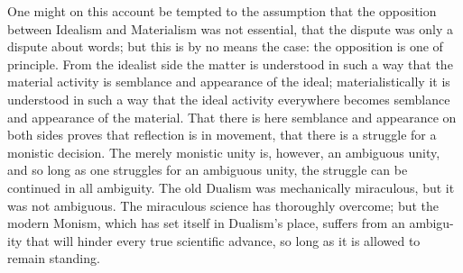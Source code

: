 \documentclass[12pt]{article}
\begin{document}
One might on this account be tempted to the assumption that the opposition
between Idealism and Materialism was not essential, that the dispute was
only a dispute about words; but this is by no means the case: the opposition
is one of principle. From the idealist side the matter is understood in such
a way that the material activity is semblance and appearance of the ideal;
materialistically it is understood in such a way that the ideal activity
everywhere becomes semblance and appearance of the material. That there is
here semblance and appearance on both sides proves that reflection is in
movement, that there is a struggle for a monistic decision. The merely
monistic unity is, however, an ambiguous unity, and so long as one struggles
for an ambiguous unity, the struggle can be continued in all ambiguity. The
old Dualism was mechanically miraculous, but it was not ambiguous. The
miraculous science has thoroughly overcome; but the modern Monism, which has
set itself in Dualism's place, suffers from an ambigu-
ity that will hinder every true scientific advance, so long as it is allowed
to remain standing.
\end{document}
